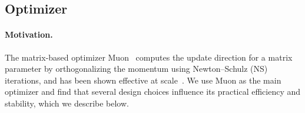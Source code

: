 
\subsection{Optimizer}
\label{sec:optimizer}

\paragraph{Motivation.}
\label{sec:optimizer-motivation}


The matrix-based optimizer Muon~\citep{jordan2024muon} computes the update direction for a matrix parameter by orthogonalizing the momentum using Newton--Schulz (NS) iterations, and has been shown effective at scale~\citep{liu2025moonlight,kimi2025k2}. We use Muon as the main optimizer and find that several design choices influence its practical efficiency and stability, which we describe below.


